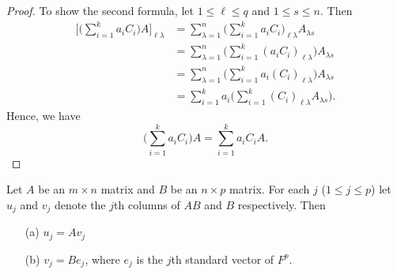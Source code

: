 \begin{proof}
To show the second formula, let \( 1 \leq \ell \leq q  \) and \( 1 \leq  s  \leq n   \). Then
\begin{align*}
    \Big[ \Big( \sum_{ i=1 }^{ k  } {a}_{i} {C}_{i}  \Big) A  \Big]_{\ell \lambda }  &= \sum_{ \lambda = 1  }^{ n   } \Big( \sum_{ i=1 }^{ k  } {a}_{i} {C}_{i} \Big)_{\ell \lambda } {A}_{\lambda s }  \\
                                                                                     &= \sum_{ \lambda = 1  }^{ n } \Big( \sum_{ i=1 }^{  k   } ({a}_{i} {C}_{i})_{\ell \lambda }  \Big) {A}_{\lambda s } \\
                                                                                     &= \sum_{ \lambda = 1  }^{ n } \Big( \sum_{ i=1 }^{  k   } {a}_{i} ({C}_{i})_{\ell \lambda }  \Big) {A}_{\lambda s } \\
                                                                                     &= \sum_{ i =1  }^{ k  } {a}_{i} \Big( \sum_{ i=1  }^{ k  } {({C}_{i})}_{\ell \lambda } {A}_{\lambda s }  \Big) \tag{part (a) of Theorem 2.12}  .
\end{align*}
Hence, we have
\[  \Big( \sum_{ i=1  }^{  k  } {a}_{i} {C}_{i}  \Big) A = \sum_{ i=1  }^{ k  } {a}_{i} {C}_{i} A. \]
\end{proof}



\begin{theorem} 
   Let \( A  \) be an \( m \times n  \) matrix and \( B  \) be an \( n \times p  \) matrix. For each \( j  \) (\( 1 \leq j \leq p  \)) let \( {u}_{j}  \) and \(  {v}_{j}  \) denote the \( j \)th columns of \( AB  \) and \( B  \) respectively. Then
    \begin{enumerate}
        \item[(a)]  \( {u}_{j} = A {v}_{j}  \)
        \item[(b)] \( {v}_{j} = B {e}_{j }  \), where \( {e}_{j}  \) is the \( j \)th standard vector of \( F^{p} \).
    \end{enumerate}
\end{theorem}

